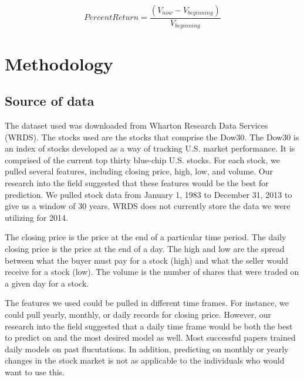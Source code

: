 \documentclass{article}
\begin{document}
$$
Percent Return = \frac{(V_{now} - V_{beginning})}{V_{beginning}}
$$

\section{Methodology}

\subsection{Source of data}
The dataset used was downloaded from Wharton Research Data Services (WRDS). The stocks used are the stocks that comprise the Dow30. The Dow30 is an index of stocks developed as a way of tracking U.S. market performance. It is comprised of the current top thirty blue-chip U.S. stocks. For each stock, we pulled several features, including closing price, high, low, and volume. Our research into the field suggested that these features would be the best for prediction. We pulled stock data from January 1, 1983 to December 31, 2013 to give us a window of 30 years. WRDS does not currently store the data we were utilizing for 2014.

The closing price is the price at the end of a particular time period. The daily closing price is the price at the end of a day. The high and low are the spread between what the buyer must pay for a stock (high) and what the seller would receive for a stock (low). The volume is the number of shares that were traded on a given day for a stock.

The features we used could be pulled in different time frames. For instance, we could pull yearly, monthly, or daily records for closing price. However, our research into the field suggested that a daily time frame would be both the best to predict on and the most desired model as well. Most successful papers trained daily models on past flucutations. In addition, predicting on monthly or yearly changes in the stock market is not as applicable to the individuals who would want to use this.
\end{document}
